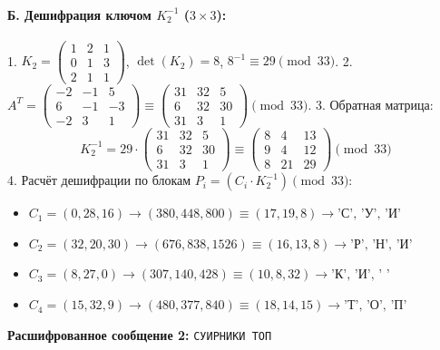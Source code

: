 \paragraph{Б. Дешифрация ключом $K_2^{-1}$ ($3\times3$):}
1. $K_2 = \begin{pmatrix} 1 & 2 & 1 \\ 0 & 1 & 3 \\ 2 & 1 & 1 \end{pmatrix}$, $\det(K_2) = 8$, $8^{-1} \equiv 29 \pmod{33}$.
2. $A^T = \begin{pmatrix} -2 & -1 & 5 \\ 6 & -1 & -3 \\ -2 & 3 & 1 \end{pmatrix} \equiv \begin{pmatrix} 31 & 32 & 5 \\ 6 & 32 & 30 \\ 31 & 3 & 1 \end{pmatrix} \pmod{33}$.
3. Обратная матрица:
   \[
   K_2^{-1} = 29 \cdot \begin{pmatrix} 31 & 32 & 5 \\ 6 & 32 & 30 \\ 31 & 3 & 1 \end{pmatrix} \equiv \begin{pmatrix} 8 & 4 & 13 \\ 9 & 4 & 12 \\ 8 & 21 & 29 \end{pmatrix} \pmod{33}
   \]
4. Расчёт дешифрации по блокам $P_i = (C_i \cdot K_2^{-1}) \pmod{33}$:
   \begin{itemize}
       \item $C_1 = (0, 28, 16) \rightarrow (380, 448, 800) \equiv (17, 19, 8) \rightarrow \text{'С', 'У', 'И'}$
       \item $C_2 = (32, 20, 30) \rightarrow (676, 838, 1526) \equiv (16, 13, 8) \rightarrow \text{'Р', 'Н', 'И'}$
       \item $C_3 = (8, 27, 0) \rightarrow (307, 140, 428) \equiv (10, 8, 32) \rightarrow \text{'К', 'И', ' '}$
       \item $C_4 = (15, 32, 9) \rightarrow (480, 377, 840) \equiv (18, 14, 15) \rightarrow \text{'Т', 'О', 'П'}$
   \end{itemize}
\textbf{Расшифрованное сообщение 2:} \texttt{СУИРНИКИ ТОП}

